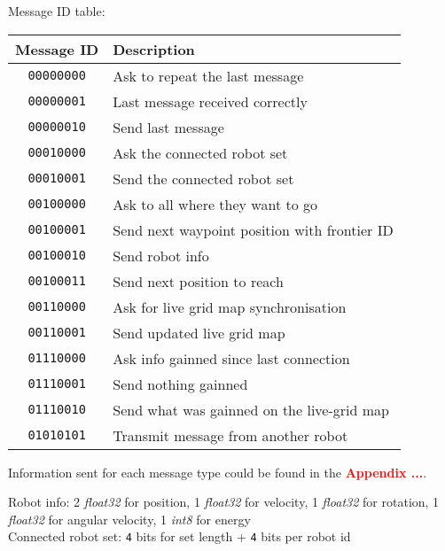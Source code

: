 \documentclass[../main.tex]{subfiles}
\begin{document}
Message ID table:
\begin{table}[H]
	\centering
	\begin{tabular}{c l}
		\hline
		\textbf{Message ID} & \textbf{Description} \\
		\hline
		\texttt{00000000} & Ask to repeat the last message\\
		\texttt{00000001} & Last message received correctly\\
		\texttt{00000010} & Send last message\\[5pt]
		
		\texttt{00010000} & Ask the connected robot set\\
		\texttt{00010001} & Send the connected robot set\\[5pt]
		
		\texttt{00100000} & Ask to all where they want to go\\
		\texttt{00100001} & Send next waypoint position with frontier ID\\
		\texttt{00100010} & Send robot info\\
		\texttt{00100011} & Send next position to reach\\[5pt]
		
		\texttt{00110000} & Ask for live grid map synchronisation\\
		\texttt{00110001} & Send updated live grid map\\[5pt]
		
		\texttt{01110000} & Ask info gainned since last connection\\
		\texttt{01110001} & Send nothing gainned\\
		\texttt{01110010} & Send what was gainned on the live-grid map\\[5pt]

		\texttt{01010101} & Transmit message from another robot\\
		\hline
	\end{tabular}
\end{table}


Information sent for each message type could be found in the \textcolor{red}{\textbf{Appendix ...}}.

Robot info:
2 \textit{float32} for position, 1 \textit{float32} for velocity, 1 \textit{float32} for rotation, 1 \textit{float32} for angular velocity, 1 \textit{int8} for energy\\

Connected robot set:
\texttt{4} bits for set length + \texttt{4} bits per robot id
\end{document}
